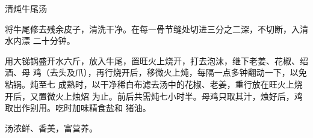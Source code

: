 \begin{recipe}{清炖牛尾汤}

\ingredients



\preparation

将牛尾修去残余皮子，清洗干净。在每一骨节缝处切进三分之二深，不切断，入清水内漂
二十分钟。

用大锑锅盛开水六斤，放入牛尾，置旺火上烧开，打去泡沫，继下老姜、花椒、绍酒、母
鸡（去头及爪），再行烧开后，移微火上炖，每隔一点多钟翻动一下，以免粘锅。炖至七
成熟时，以干净稀白布滤去汤中的花椒、老姜，重行放在旺火上烧开后，又置微火上烛炤
为止。前后共需炖七小时半。母鸡只取其汁，烛好后，鸡取出作别用。吃时加味精食盐和
猪油。

\features

汤浓鲜、香美，富营养。

\end{recipe}

